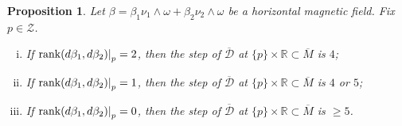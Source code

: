 \documentclass{amsart}
\theoremstyle{plain}
\newtheorem{proposition}[theorem]{Proposition}
\theoremstyle{definition}
\theoremstyle{remark}
\newcommand{\R}{\mathbb{R}}
\newcommand{\diff}{d}%
\newcommand{\distr}{\mathcal{D}}								%
\newcommand{\B}{\beta}
\newcommand{\lift}[1]{\overline{#1}} 							%
\newcommand{\mg}{\B_1\nu_1\wedge \omega
										+\B_2\nu_2\wedge \omega}	%
\newcommand\restr[2]{{													%
  \left.\kern-\nulldelimiterspace 					
  #1 																			
  \right|_{#2} 														
  }}
\begin{document}
\begin{proposition}
\label{lem:step-rank}
Let $\B=\mg$ be a horizontal magnetic field. Fix $p\in  \mathcal{Z}$. 
\begin{enumerate}[(i)]
\item \label{item:step2} If $\mathrm{rank}\restr{\left(\diff \B_1,\diff \B_2\right)}{p}=2$, then the step of $\lift \distr$ at $\{ p \}\times \R \subset \lift M$ is $4$;
\item \label{item:step1} If $\mathrm{rank}\restr{\left(\diff \B_1,\diff \B_2\right)}{p}=1$, then the step of $\lift \distr$ at $\{ p \}\times \R \subset \lift M$ is $4$ or $5$;
\item \label{item:step0} If $\mathrm{rank}\restr{\left(\diff \B_1,\diff \B_2\right)}{p}=0$, then the step of $\lift \distr$ at $\{ p \}\times \R \subset \lift M$ is $\geq 5$.
\end{enumerate}
\end{proposition}
\end{document}
